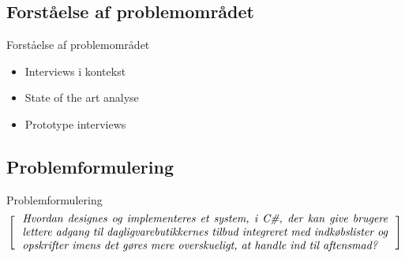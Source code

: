 \subsection{Forståelse af problemområdet}
\begin{frame}{Forståelse af problemområdet}
\begin{itemize}
   \item Interviews i kontekst
   \item State of the art analyse
   \item Prototype interviews
\end{itemize}
\end{frame}

\subsection{Problemformulering}
\begin{frame}{Problemformulering}
\[
  \left[
  \begin{minipage}{\textwidth}
  \centering
  \begin{minipage}{0.96\textwidth}
  \textit{Hvordan designes og implementeres et system, i C\#, der kan give brugere lettere adgang til dagligvarebutikkernes tilbud integreret med indkøbslister og opskrifter imens det gøres mere overskueligt, at handle ind til aftensmad?}
  \end{minipage} 
  \end{minipage}                           
    \right]
\]
\end{frame}
